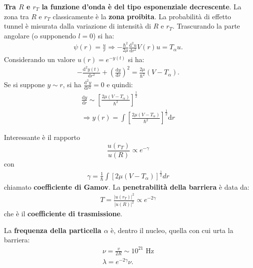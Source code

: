 \documentclass[a4paper,11pt,twoside,openany]{book}
\theoremstyle{definition}
\theoremstyle{plain}
\theoremstyle{plain}
\theoremstyle{definition}
\begin{document}
\textbf{Tra $R$ e $r_T$ la funzione d'onda è del tipo esponenziale decrescente}. La zona tra $R$ e $r_T$ classicamente è la \textbf{zona proibita}. La probabilità di effetto tunnel è misurata dalla variazione di intensità di $R$ e $r_T$. Trascurando la parte angolare (o supponendo $l=0$) si ha:
\begin{equation}\begin{split}
\psi \left(r\right)=\frac{u}{r} \Longrightarrow -\frac{\hbar ^2}{2\mu}\frac{\textrm{d}^2u}{\textrm{d}r^2}V\left(r\right)u=T_{\alpha}u.
\end{split}\end{equation}
Considerando un valore $u\left(r\right)=e^{-y\left(t\right)}$ si ha:
\begin{equation}\begin{split}
-\frac{\textrm{d}^2y\left(t\right)}{\textrm{d}r^2}+\left(\frac{\textrm{d}y}{\textrm{d}r}\right)^2=\frac{2\mu}{\hbar ^2}\left(V-T_{\alpha}\right).
\end{split}\end{equation}
Se si suppone $y\sim r$, si ha $\frac{\textrm{d}^2y}{\textrm{d}r^2}=0$ e quindi:
\begin{equation}\begin{split}
\frac{\textrm{d}y}{\textrm{d}r}\sim\left[\frac{2\mu\left(V-T_{\alpha}\right)}{\hbar ^2}\right]^{\frac{1}{2}}\\
\Longrightarrow y\left(r\right)=\int{\left[\frac{2\mu\left(V-T_{\alpha}\right)}{\hbar ^2}\right]^{\frac{1}{2}}\textrm{d}r}
\end{split}\end{equation}

Interessante è il rapporto $$\frac{u\left(r_T\right)}{u\left(R\right)}\propto e^{-\gamma}$$ con
\begin{equation}\begin{split}
\gamma=\frac{1}{\hbar }\int{\left[2\mu\left(V-T_{\alpha}\right)\right]^{\frac{1}{2}}dr}
\end{split}\end{equation}
chiamato \textbf{coefficiente di Gamov}. La \textbf{penetrabilità della barriera} è data da:
\begin{equation}\begin{split}
T=\frac{\left|u\left(r_T\right)\right|^2}{\left|u\left(R\right)\right|^2}\propto e^{-2\gamma}
\end{split}\end{equation}
che è il \textbf{coefficiente di trasmissione}.

La \textbf{frequenza della particella $\alpha$} è, dentro il nucleo, quella con cui urta la barriera:
\begin{equation}\begin{split}
\nu=\frac{v}{2R}\sim 10^{21} \textrm{ Hz}\\
\lambda=e^{-2\gamma}\nu.
\end{split}\end{equation}
\end{document}
